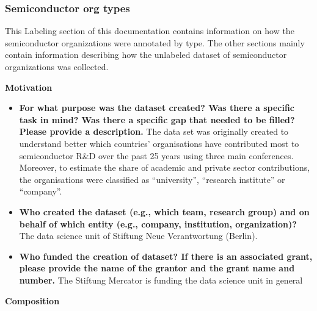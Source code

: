 \documentclass{article}
\begin{document}
\subsubsection{Semiconductor org types}

This Labeling section of this documentation contains information on how the semiconductor organizations were annotated by type. The other sections mainly contain information describing how the unlabeled dataset of semiconductor organizations was collected.

\textbf{Motivation}

\begin{itemize}
    \item \textbf{For what purpose was the dataset created? Was there a specific task in mind? Was there a specific gap that needed to be filled? Please provide a description.} The data set was originally created to understand better which countries’ organisations have contributed most to semiconductor R\&D over the past 25 years using three main conferences. Moreover, to estimate the share of academic and private sector contributions, the organisations were classified as “university”, “research institute” or “company”.
    \item \textbf{Who created the dataset (e.g., which team, research group) and on behalf of which entity (e.g., company, institution, organization)?} The data science unit of Stiftung Neue Verantwortung (Berlin).
    \item \textbf{Who funded the creation of dataset? If there is an associated grant, please provide the name of the grantor and the grant name and number.} The Stiftung Mercator is funding the data science unit in general

\end{itemize}

\textbf{Composition}
\end{document}
